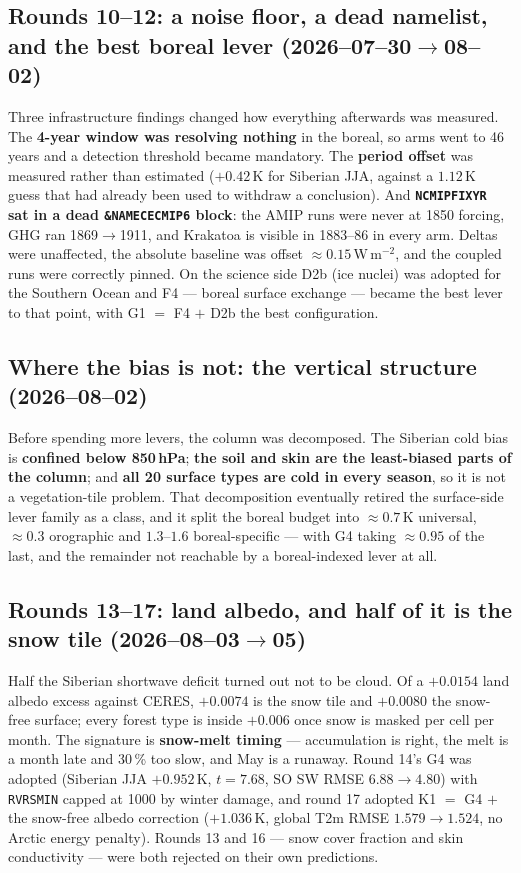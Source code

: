 \documentclass[10pt]{article}
\begin{document}
\subsection{Rounds 10--12: a noise floor, a dead namelist, and the best boreal lever
(2026--07--30$\to$08--02)}

Three infrastructure findings changed how everything afterwards was measured. The
\textbf{4-year window was resolving nothing} in the boreal, so arms went to 46 years and a
detection threshold became mandatory. The \textbf{period offset} was measured rather than
estimated ($+0.42$\,K for Siberian JJA, against a $1.12$\,K guess that had already been used
to withdraw a conclusion). And \textbf{\texttt{NCMIPFIXYR} sat in a dead
\texttt{\&NAMECECMIP6} block}: the AMIP runs were never at 1850 forcing, GHG ran
1869$\to$1911, and Krakatoa is visible in 1883--86 in every arm. Deltas were unaffected, the
absolute baseline was offset ${\approx}0.15$\,W\,m$^{-2}$, and the coupled runs were
correctly pinned. On the science side D2b (ice nuclei) was adopted for the Southern Ocean
and F4 --- boreal surface exchange --- became the best lever to that point, with
G1 $=$ F4 $+$ D2b the best configuration.

\subsection{Where the bias is not: the vertical structure (2026--08--02)}

Before spending more levers, the column was decomposed. The Siberian cold bias is
\textbf{confined below 850\,hPa}; \textbf{the soil and skin are the least-biased parts of
the column}; and \textbf{all 20 surface types are cold in every season}, so it is not a
vegetation-tile problem. That decomposition eventually retired the surface-side lever family
as a class, and it split the boreal budget into ${\approx}0.7$\,K universal, ${\approx}0.3$
orographic and $1.3$--$1.6$ boreal-specific --- with G4 taking ${\approx}0.95$ of the last,
and the remainder not reachable by a boreal-indexed lever at all.

\subsection{Rounds 13--17: land albedo, and half of it is the snow tile
(2026--08--03$\to$05)}

Half the Siberian shortwave deficit turned out not to be cloud. Of a $+0.0154$ land albedo
excess against CERES, $+0.0074$ is the snow tile and $+0.0080$ the snow-free surface; every
forest type is inside $+0.006$ once snow is masked per cell per month. The signature is
\textbf{snow-melt timing} --- accumulation is right, the melt is a month late and 30\,\% too
slow, and May is a runaway. Round 14's G4 was adopted (Siberian JJA $+0.952$\,K, $t=7.68$,
SO SW RMSE $6.88\to4.80$) with \texttt{RVRSMIN} capped at 1000 by winter damage, and round
17 adopted K1 $=$ G4 $+$ the snow-free albedo correction ($+1.036$\,K, global T2m RMSE
$1.579\to1.524$, no Arctic energy penalty). Rounds 13 and 16 --- snow cover fraction and
skin conductivity --- were both rejected on their own predictions.
\end{document}

